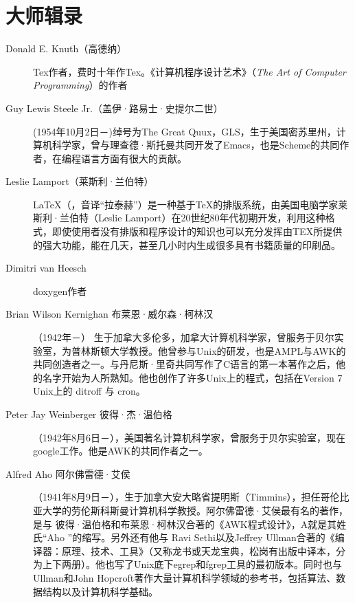 \section{大师辑录}
\begin{description}
\item[Donald E. Knuth（高德纳）]
 Tex作者，费时十年作Tex。《计算机程序设计艺术》（\emph{The Art of Computer Programming}）的作者

\item[Guy Lewis Steele Jr.（盖伊·路易士·史提尔二世）]
(1954年10月2日－)绰号为The Great Quux，GLS，生于美国密苏里州，计算机科学家，曾与理查德·斯托曼共同开发了Emacs，也是Scheme的共同作者，在编程语言方面有很大的贡献。

\item[Leslie Lamport（莱斯利·兰伯特）]
LaTeX（，音译“拉泰赫”）是一种基于TeX的排版系统，由美国电脑学家莱斯利·兰伯特（Leslie Lamport）在20世纪80年代初期开发，利用这种格式，即使使用者没有排版和程序设计的知识也可以充分发挥由TEX所提供的强大功能，能在几天，甚至几小时内生成很多具有书籍质量的印刷品。
\item[Dimitri van Heesch]
doxygen作者
\item[Brian Wilson Kernighan 布莱恩·威尔森·柯林汉]
（1942年－）
生于加拿大多伦多，加拿大计算机科学家，曾服务于贝尔实验室，为普林斯顿大学教授。他曾参与Unix的研发，也是AMPL与AWK的共同创造者之一。与丹尼斯·里奇共同写作了C语言的第一本著作之后，他的名字开始为人所熟知。他也创作了许多Unix上的程式，包括在Version 7 Unix上的 ditroff 与 cron。

\item[Peter Jay Weinberger 彼得·杰·温伯格] 
（1942年8月6日－），美国著名计算机科学家，曾服务于贝尔实验室，现在google工作。他是AWK的共同作者之一。
\item[Alfred Aho 阿尔佛雷德·艾侯]
（1941年8月9日－），生于加拿大安大略省提明斯（Timmins），担任哥伦比亚大学的劳伦斯科斯曼计算机科学教授。阿尔佛雷德·艾侯最有名的著作，是与 彼得·温伯格和布莱恩·柯林汉合著的《AWK程式设计》，A就是其姓氏“Aho ”的缩写。另外还有他与 Ravi Sethi以及Jeffrey Ullman合著的《编译器：原理、技术、工具》（又称龙书或天龙宝典，松岗有出版中译本，分为上下两册）。他也写了Unix底下egrep和fgrep工具的最初版本。同时也与Ullman和John Hopcroft著作大量计算机科学领域的参考书，包括算法、数据结构以及计算机科学基础。


\end{description}
